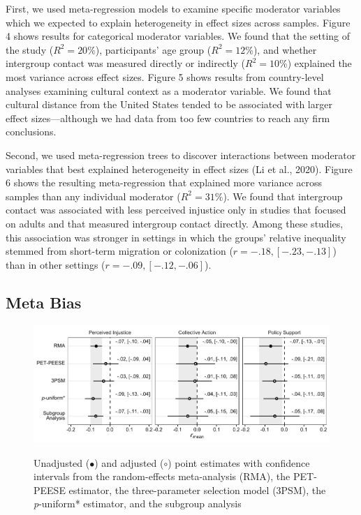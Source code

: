 \documentclass[twocolumn, 11pt, letterpaper]{article}
\begin{document}
First, we used meta-regression models to examine specific moderator
variables which we expected to explain heterogeneity in effect sizes
across samples. Figure 4 shows results for categorical moderator
variables. We found that the setting of the study (\(R^2 = 20\%\)),
participants' age group (\(R^2 = 12\%\)), and whether intergroup contact
was measured directly or indirectly (\(R^2 = 10\%\)) explained the most
variance across effect sizes. Figure 5 shows results from country-level
analyses examining cultural context as a moderator variable. We found
that cultural distance from the United States tended to be associated
with larger effect sizes---although we had data from too few countries
to reach any firm conclusions.

Second, we used meta-regression trees to discover interactions between
moderator variables that best explained heterogeneity in effect sizes
(Li et al., 2020). Figure 6 shows the resulting meta-regression that
explained more variance across samples than any individual moderator
(\(R^2 = 31\%\)). We found that intergroup contact was associated with
less perceived injustice only in studies that focused on adults and that
measured intergroup contact directly. Among these studies, this
association was stronger in settings in which the groups' relative
inequality stemmed from short-term migration or colonization
(\(r = -.18, [-.23, -.13]\)) than in other settings
(\(r = -.09, [-.12, -.06]\)).

\hypertarget{meta-bias}{%
\subsection{Meta Bias}\label{meta-bias}}

\begin{figure}
\centering
\caption{Unadjusted ($\bullet$) and adjusted ($\circ$) point estimates with confidence intervals from the random-effects meta-analysis (RMA), the PET-PEESE estimator, the three-parameter selection model (3PSM), the \textit{p}-uniform* estimator, and the subgroup analysis}
\includegraphics[scale=1]{../figures/figure-7}
\label{fig:f7}
\end{figure}
\end{document}
